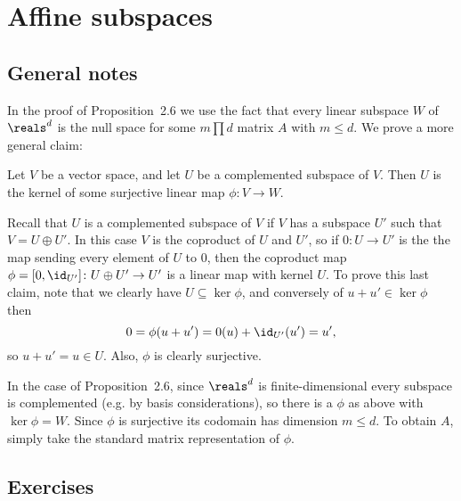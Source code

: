 \documentclass[article, a4paper, 11pt, oneside]{memoir}
\title{\doctitle}
\author{\docauthor}
\numberwithin{equation}{chapter}
\newenvironment{displaytheorem}{%
	\begin{displayquote}\itshape%
}{%
	\end{displayquote}%
}
\theoremstyle{nonumberplain}
\begin{document}
\maketitle

\addtocounter{chapter}{1}

\chapter{Affine subspaces}

\section*{General notes}

\begin{remarkbreak}
    In the proof of Proposition~2.6 we use the fact that every linear subspace $W$ of $\reals^d$ is the null space for some $m \prod d$ matrix $A$ with $m \leq d$. We prove a more general claim:
    \begin{displaytheorem}
        Let $V$ be a vector space, and let $U$ be a complemented subspace of $V$. Then $U$ is the kernel of some surjective linear map $\phi \colon V \to W$.
    \end{displaytheorem}
    Recall that $U$ is a complemented subspace of $V$ if $V$ has a subspace $U'$ such that $V = U \oplus U'$. In this case $V$ is the coproduct of $U$ and $U'$, so if $0 \colon U \to U'$ is the the map sending every element of $U$ to $0$, then the coproduct map $\phi = [0, \id_{U'}] \colon U \oplus U' \to U'$ is a linear map with kernel $U$. To prove this last claim, note that we clearly have $U \subseteq \ker\phi$, and conversely of $u + u' \in \ker\phi$ then
    \begin{equation*}
        0
            = \phi(u+u')
            = 0(u) + \id_{U'}(u')
            = u',
    \end{equation*}
    so $u + u' = u \in U$. Also, $\phi$ is clearly surjective.

    In the case of Proposition~2.6, since $\reals^d$ is finite-dimensional every subspace is complemented (e.g. by basis considerations), so there is a $\phi$ as above with $\ker\phi = W$. Since $\phi$ is surjective its codomain has dimension $m \leq d$. To obtain $A$, simply take the standard matrix representation of $\phi$.
\end{remarkbreak}


\section*{Exercises}
\end{document}

